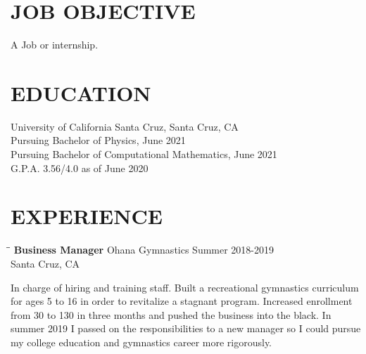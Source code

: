 \documentclass{res}
\begin{document}
 


\address{\bf  PRESENT ADDRESS\\522 14th ave.\\Santa Cruz, CA 95062\\(831) 428-6558}
                                  
\begin{resume}

\section{JOB OBJECTIVE}          
    A Job or internship.          
 
\section{EDUCATION}          
    University of California Santa Cruz, Santa Cruz, CA  \\        
    Pursuing Bachelor of Physics, June 2021   \\ 
    Pursuing Bachelor of Computational Mathematics, June 2021	  \\              
    G.P.A. 3.56/4.0 as of June 2020         

 
\section{EXPERIENCE}
   \vspace{-0.1in}	
   \begin{tabbing}
   \hspace{2.3in}\= \hspace{2.6in}\= \kill %
    {\bf Business Manager} \>Ohana Gymnastics     \>Summer 2018-2019\\
                             \>Santa Cruz, CA
   \end{tabbing}\vspace{-20pt}      %
    In charge of hiring and training staff. Built a recreational gymnastics curriculum 			for ages 5 to 16 in order to revitalize a stagnant program. Increased enrollment 			from 30 to 130 in three months and pushed the business into the black. In summer			2019 I passed on the responsibilities to a new manager so I could pursue my college 		education and gymnastics career more rigorously. 
    

\end{resume}
\end{document}
